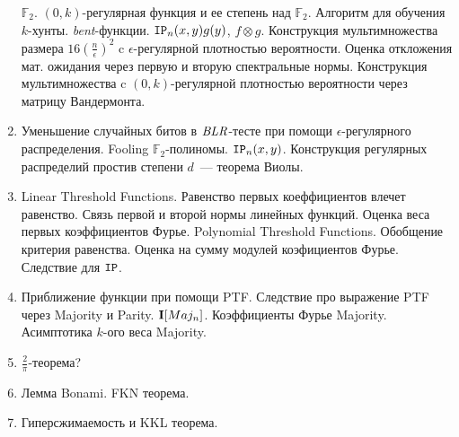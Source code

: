 \begin{enumerate}
        $\mathbb{F}_2$. $(0, k)$-регулярная функция и ее степень над $\mathbb{F}_2$. Алгоритм для обучения
        $k$-хунты. \textit{bent}-функции. $\mathtt{IP}_n(x, y) g(y)$, $f \otimes g$. Конструкция мультимножества размера $16
        (\frac{n}{\epsilon})^2$ c $\epsilon$-регулярной плотностью вероятности. Оценка откложения мат. ожидания через первую
        и вторую спектральные нормы. Конструкция мультимножества c $(0, k)$-регулярной плотностью вероятности через матрицу
        Вандермонта.
    \item Уменьшение случайных битов в $\mathit{BLR}$-тесте при помощи $\epsilon$-регулярного распределения. Fooling
        $\mathbb{F}_2$-полиномы. $\mathtt{IP}_n(x, y)$. Конструкция регулярных распределий простив степени $d$~--- теорема Виолы.
    \item Linear Threshold Functions. Равенство первых коеффициентов влечет равенство. Связь первой и второй нормы линейных
        функций. Оценка веса первых коэффициентов Фурье. Polynomial Threshold Functions. Обобщение критерия равенства. Оценка
        на сумму модулей коэфициентов Фурье. Следствие для $\mathtt{IP}$.
    \item Приближение функции при помощи PTF. Следствие про выражение PTF через Majority и Parity. $\mathbf{I}[Maj_n]$. Коэффициенты
        Фурье Majority. Асимптотика $k$-ого веса Majority.
    \item $\frac{2}{\pi}$-теорема?
    \item Лемма Bonami. FKN теорема.
    \item Гиперсжимаемость и KKL теорема.
\end{enumerate}
